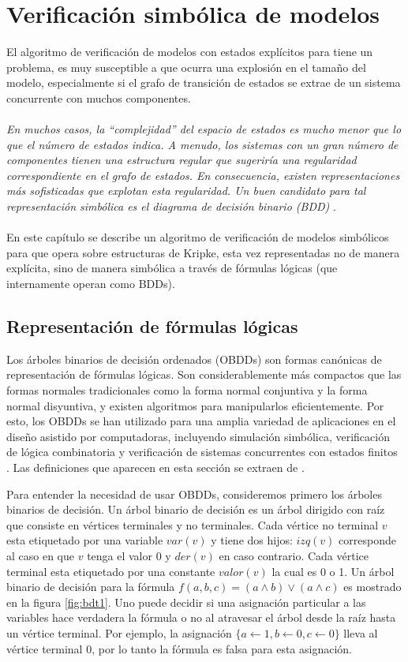 \chapter{Verificación simbólica de modelos}

El algoritmo de verificación de modelos con estados explícitos para {\mucalculo} tiene un problema, es muy susceptible a que ocurra una explosión en el tamaño del modelo, especialmente si el grafo de transición de estados se extrae de un sistema concurrente con muchos componentes. \\
\\
\textit{En muchos casos, la “complejidad” del espacio de estados es mucho menor que lo que el número de estados indica. A menudo, los sistemas con un gran número de componentes tienen una estructura regular que sugeriría una regularidad correspondiente en el grafo de estados. En consecuencia, existen representaciones más sofisticadas que explotan esta regularidad. Un buen candidato para tal representación simbólica es el diagrama de decisión binario (BDD)} \cite{Burch:4}.\\ 
\\
En este capítulo se describe un algoritmo de verificación de modelos simbólicos para {\mucalculo} que opera sobre estructuras de Kripke, esta vez representadas no de manera explícita, sino de manera simbólica a través de fórmulas lógicas (que internamente operan como BDDs).

\section{Representación de fórmulas lógicas}

Los árboles binarios de decisión ordenados (OBDDs) son formas canónicas de representación de fórmulas lógicas. Son considerablemente más compactos que las formas normales tradicionales como la forma normal conjuntiva y la forma normal disyuntiva, y existen algoritmos para manipularlos eficientemente. Por esto, los OBDDs se han utilizado para una amplia variedad de aplicaciones en el diseño asistido por computadoras, incluyendo simulación simbólica, verificación de lógica combinatoria y verificación de sistemas concurrentes con estados finitos \cite{Clarke:1}. Las definiciones que aparecen en esta sección se extraen de \cite{Clarke:1}.

\noindent Para entender la necesidad de usar OBDDs, consideremos primero los árboles binarios de decisión. Un árbol binario de decisión es un árbol dirigido con raíz que consiste en vértices terminales y no terminales. Cada vértice no terminal $v$ esta etiquetado por una variable $var(v)$ y tiene dos hijos: $izq(v)$ corresponde al caso en que $v$ tenga el valor 0 y $der(v)$ en caso contrario. Cada vértice terminal esta etiquetado por una constante $valor(v)$ la cual es 0 o 1. Un árbol binario de decisión para la fórmula $f(a,b,c) = (a \land b) \lor (a \land c)$ es mostrado en la figura \ref{fig:bdt1}. Uno puede decidir si una asignación particular a las variables hace verdadera la fórmula o no al atravesar el árbol desde la raíz hasta un vértice terminal. Por ejemplo, la asignación $\{ a \gets 1, b \gets 0, c \gets 0\}$ lleva al vértice terminal 0, por lo tanto la fórmula es falsa para esta asignación.

